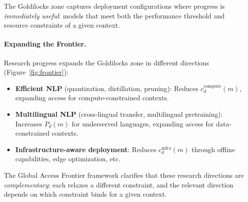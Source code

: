 The Goldilocks zone captures deployment configurations where progress is \emph{immediately useful}: models that meet both the performance threshold and resource constraints of a given context.

\paragraph{Expanding the Frontier.} Research progress expands the Goldilocks zone in different directions (Figure~\ref{fig:frontier}):
\begin{itemize}
    \item \textbf{Efficient NLP} (quantization, distillation, pruning): Reduces $c_d^{\text{compute}}(m)$, expanding access for compute-constrained contexts.
    \item \textbf{Multilingual NLP} (cross-lingual transfer, multilingual pretraining): Increases $P_d(m)$ for underserved languages, expanding access for data-constrained contexts.
    \item \textbf{Infrastructure-aware deployment}: Reduces $c_d^{\text{infra}}(m)$ through offline capabilities, edge optimization, etc.
\end{itemize}

The Global Access Frontier framework clarifies that these research directions are \emph{complementary}: each relaxes a different constraint, and the relevant direction depends on which constraint binds for a given context.


